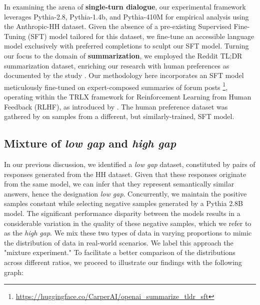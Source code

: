 
In examining the arena of \textbf{single-turn dialogue}, our experimental framework leverages Pythia-2.8, Pythia-1.4b, and Pythia-410M for empirical analysis using the Anthropic-HH dataset. Given the absence of a pre-existing Supervised Fine-Tuning (SFT) model tailored for this dataset, we fine-tune an accessible language model exclusively with preferred completions to sculpt our SFT model.
Turning our focus to the domain of \textbf{summarization}, we employed the Reddit TL;DR summarization dataset, enriching our research with human preferences as documented by the study \cite{tldr2}. Our methodology here incorporates an SFT model meticulously fine-tuned on expert-composed summaries of forum posts \footnote{\url{https://huggingface.co/CarperAI/openai_summarize_tldr_sft}}, operating within the TRLX framework for Reinforcement Learning from Human Feedback (RLHF), as introduced by \citet{havrilla-etal-2023-trlx}. The human preference dataset was gathered by \citet{tldr2} on samples from a different, but similarly-trained, SFT model.
\subsection{Mixture of \emph{low gap} and \emph{high gap}}
\label{low_gap_high_gap}

In our previous discussion, we identified a \emph{low gap} dataset, constituted by pairs of responses generated from the HH dataset. Given that these responses originate from the same model, we can infer that they represent semantically similar answers, hence the designation \emph{low gap}. Concurrently, we maintain the positive samples constant while selecting negative samples generated by a Pythia 2.8B model. The significant performance disparity between the models results in a considerable variation in the quality of these negative samples, which we refer to as the \emph{high gap}. We mix these two types of data in varying proportions to mimic the distribution of data in real-world scenarios. We label this approach the "mixture experiment." To facilitate a better comparison of the distributions across different ratios, we proceed to illustrate our findings with the following graph:

